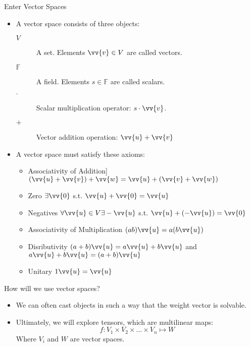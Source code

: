 \documentclass[handout]{beamer}
\begin{document}
\begin{frame}{Enter Vector Spaces}
    \begin{itemize}
        \item A vector space consists of three objects:
        \begin{description}
            \item[$V$] A set. Elements $\vv{v} \in V$ are called vectors.
            \item[$\mathbb{F}$] A field. Elements $s \in \mathbb{F}$ are called scalars.
            \item[$\cdot$] Scalar multiplication operator: $s \cdot \vv{v}$.
            \item[$+$] Vector addition operation: $\vv{u} + \vv{v}$
        \end{description}
        \item A vector space must satisfy these axioms:
        \begin{itemize}
            \item Associativity of Addition] $(\vv{u} + \vv{v}) + \vv{w} = \vv{u} + (\vv{v} + \vv{w})$
            \item Zero  $\exists \vv{0}$ s.t. $\vv{u} + \vv{0} = \vv{u}$ 
            \item Negatives  $\forall \vv{u} \in V \exists -\vv{u}$ s.t. $\vv{u} + (-\vv{u}) = \vv{0}$
            \item Associativity of Multiplication $(ab)\vv{u} = a(b\vv{u})$ 
            \item Disributivity  $(a+b)\vv{u} = a\vv{u} + b\vv{u}$ and $a\vv{u} + b\vv{u} = (a+b)\vv{u}$
            \item Unitary  $1\vv{u} = \vv{u}$
        \end{itemize}
    \end{itemize}
\end{frame}

\begin{frame}{How will we use vector spaces?}
    \begin{itemize}
        \item We can often cast objects in such a way that the weight vector is solvable.
        \item Ultimately, we will explore tensors, which are multilinear maps:
        \[
        f : V_1 \times V_2 \times \ldots \times V_n \mapsto W 
        \]
        Where $V_i$ and $W$ are vector spaces.
    \end{itemize}
\end{frame}
\end{document}
